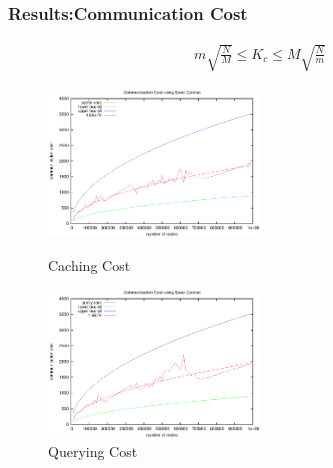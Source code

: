 \documentclass[red]{beamer}
\begin{document}
\begin{frame}
\frametitle{Results:Communication Cost}
\begin{eqnarray}
m\sqrt{\frac{N}{M}} \leq K_c \leq M\sqrt{\frac{N}{m}}
\end{eqnarray}
\begin{figure}
\begin{minipage}{5cm}
\centering
\includegraphics[width=2.2in]{figs/cache_cost_fit.eps}
\caption{Caching Cost} 
\end{minipage}
\begin{minipage}{5cm}
\centering
\includegraphics[width=2.2in]{figs/query_cost_fit.eps}
\caption{Querying Cost}
\end{minipage}
\end{figure}
\end{frame}
\end{document}
